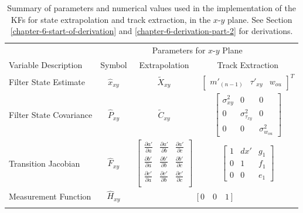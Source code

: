 \begin{table}[!h]
\caption{Summary of parameters and numerical values used in the implementation of the KFs for state extrapolation and track extraction, in the $x$-$y$ plane. See Section \ref{chapter-6-start-of-derivation} and \ref{chapter-6-derivation-part-2} for derivations.}
\begin{center}
\begin{tabular}{lccc}
\toprule
& \multicolumn{3}{c}{Parameters for $x$-$y$ Plane} \\
Variable Description & Symbol  & Extrapolation  & Track Extraction  \\
\hline
\rule{0pt}{3ex}%

Filter State Estimate
& $\hat{x}_{xy}$
& $\tilde{X}_{xy}$
& $\begin{bmatrix} m'_{(n-1)} & \tau'_{xy} & w_{ou} \end{bmatrix}^{T}$
\\
\rule{0pt}{4ex}%

Filter State Covariance
& $\hat{P}_{xy}$ 
& $\tilde{C}_{xy}$ 
& $\begin{bmatrix} \sigma_{xy}^2 & 0 & 0 
                   \\ 0 & \sigma_{\tau_{xy}}^2 & 0 
                    \\ 0 & 0 & \sigma_{w_{ou}}^2 \end{bmatrix}$
\\
\rule{0pt}{4ex}%

Transition Jacobian
& $\hat{F}_{xy}$ 
& $\begin{bmatrix} 
        \frac{\partial a'}{\partial a} & \frac{\partial a'}{\partial b} & \frac{\partial a'}{\partial c} \\ 
        
        \frac{\partial b'}{\partial a} & \frac{\partial b'}{\partial b} & \frac{\partial b'}{\partial c} \\
        
        \frac{\partial c'}{\partial a} & \frac{\partial c'}{\partial b} & \frac{\partial c'}{\partial c} \\
        \end{bmatrix}$
& $\begin{bmatrix} 1 & dx' & g_1 \\ 0 & 1 & f_1 \\ 0 & 0 & e_1 \end{bmatrix} $
\\
\rule{0pt}{3ex}%


Measurement Function
& $\hat{H}_{xy}$ 
& \multicolumn{2}{c}{$[0 \quad 0 \quad 1]$}
\\
\rule{0pt}{3ex}%


\end{tabular}
\end{center}
\end{table}
